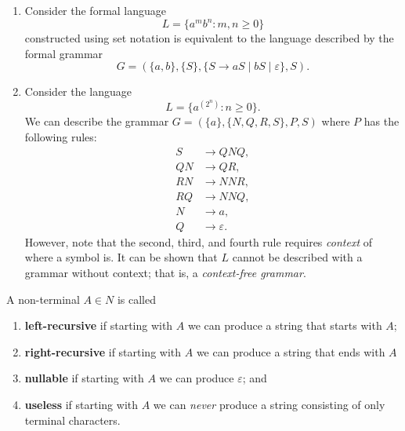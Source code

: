 \begin{example}
    \hfill
    \begin{enumerate}
        \item
            Consider the formal language
            \[ L = \{a^mb^n : m, n \geq 0\} \]
            constructed using set notation
            is equivalent to the language described by
            the formal grammar 
            \[
                G = \left(\{a,b\}, \{S\}, \{S \to aS \mid bS \mid \varepsilon\}, S\right).
            \]
    
        \item 
            Consider the language
            \[
                L = \{a^{\left(2^n\right)} : n \geq 0\}.
            \]
            We can describe the grammar $G = (\{a\}, \{N,Q,R,S\}, P, S)$
            where $P$ has the following rules:
            \begin{align*}
                S  &\to QNQ, \\
                QN &\to QR,  \\
                RN &\to NNR, \\
                RQ &\to NNQ, \\
                N  &\to a,   \\
                Q  &\to \varepsilon.
            \end{align*}
            However, note that the second, third, and fourth rule requires
            \emph{context} of where a symbol is.
            It can be shown that $L$ cannot be described with a grammar
            without context; that is, a \emph{context-free grammar}.
    \end{enumerate}
\end{example}

\begin{definition}[]
    A non-terminal $A \in N$ is called
    \begin{enumerate}
        \item \textbf{left-recursive} if starting with $A$ we can
            produce a string that starts with $A$;
        \item \textbf{right-recursive} if starting with $A$ we can
            produce a string that ends with $A$
        \item \textbf{nullable} if starting with $A$ we can produce
            $\varepsilon$; and
        \item \textbf{useless} if starting with $A$ we can 
            \emph{never} produce a string consisting of only terminal
            characters.
    \end{enumerate}
\end{definition}


